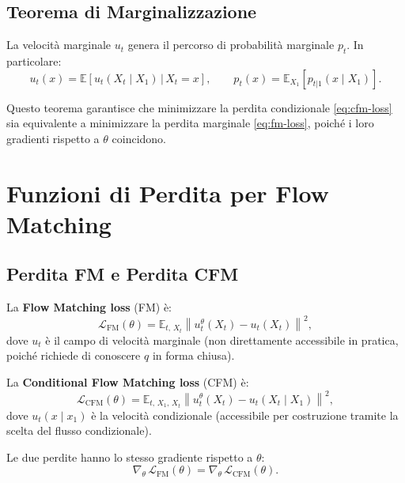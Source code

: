 \subsection{Teorema di Marginalizzazione}
\label{subsec:fm-marginalization-trick}

\begin{theorem}[Marginalizzazione]
La velocità marginale $u_t$ genera il percorso di probabilità marginale
$p_t$. In particolare:
\begin{equation}
  u_t(x) = \mathbb{E}\!\left[u_t(X_t \mid X_1)\,\big|\, X_t = x\right],
  \qquad
  p_t(x) = \mathbb{E}_{X_1}\!\left[p_{t|1}(x \mid X_1)\right].
\end{equation}
\end{theorem}

Questo teorema garantisce che minimizzare la perdita condizionale
\eqref{eq:cfm-loss} sia equivalente a minimizzare la perdita marginale
\eqref{eq:fm-loss}, poiché i loro gradienti rispetto a $\theta$
coincidono.

\section{Funzioni di Perdita per Flow Matching}
\label{sec:fm-losses}

\subsection{Perdita FM e Perdita CFM}
\label{subsec:fm-cfm-losses}

La \textbf{Flow Matching loss} (FM) è:
\begin{equation}
  \mathcal{L}_{\mathrm{FM}}(\theta) =
  \mathbb{E}_{t,\,X_t}\left\|u_t^\theta(X_t) - u_t(X_t)\right\|^2,
  \label{eq:fm-loss}
\end{equation}
dove $u_t$ è il campo di velocità marginale (non direttamente accessibile
in pratica, poiché richiede di conoscere $q$ in forma chiusa).

La \textbf{Conditional Flow Matching loss} (CFM) è:
\begin{equation}
  \mathcal{L}_{\mathrm{CFM}}(\theta) =
  \mathbb{E}_{t,\,X_1,\,X_t}\left\|u_t^\theta(X_t) - u_t(X_t \mid X_1)\right\|^2,
  \label{eq:cfm-loss}
\end{equation}
dove $u_t(x \mid x_1)$ è la velocità condizionale (accessibile per
costruzione tramite la scelta del flusso condizionale).

\begin{theorem}
Le due perdite hanno lo stesso gradiente rispetto a $\theta$:
\begin{equation}
  \nabla_\theta\,\mathcal{L}_{\mathrm{FM}}(\theta) =
  \nabla_\theta\,\mathcal{L}_{\mathrm{CFM}}(\theta).
\end{equation}
\end{theorem}

